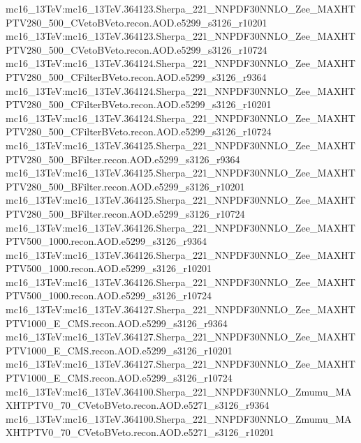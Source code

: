 { mc16\_13TeV:mc16\_13TeV.364123.Sherpa\_221\_NNPDF30NNLO\_Zee\_MAXHTPTV280\_500\_CVetoBVeto.recon.AOD.e5299\_s3126\_r10201   \newline  
 mc16\_13TeV:mc16\_13TeV.364123.Sherpa\_221\_NNPDF30NNLO\_Zee\_MAXHTPTV280\_500\_CVetoBVeto.recon.AOD.e5299\_s3126\_r10724 \newline    
 mc16\_13TeV:mc16\_13TeV.364124.Sherpa\_221\_NNPDF30NNLO\_Zee\_MAXHTPTV280\_500\_CFilterBVeto.recon.AOD.e5299\_s3126\_r9364 \newline   
 mc16\_13TeV:mc16\_13TeV.364124.Sherpa\_221\_NNPDF30NNLO\_Zee\_MAXHTPTV280\_500\_CFilterBVeto.recon.AOD.e5299\_s3126\_r10201   \newline  
 mc16\_13TeV:mc16\_13TeV.364124.Sherpa\_221\_NNPDF30NNLO\_Zee\_MAXHTPTV280\_500\_CFilterBVeto.recon.AOD.e5299\_s3126\_r10724 \newline    
 mc16\_13TeV:mc16\_13TeV.364125.Sherpa\_221\_NNPDF30NNLO\_Zee\_MAXHTPTV280\_500\_BFilter.recon.AOD.e5299\_s3126\_r9364  \newline   
 mc16\_13TeV:mc16\_13TeV.364125.Sherpa\_221\_NNPDF30NNLO\_Zee\_MAXHTPTV280\_500\_BFilter.recon.AOD.e5299\_s3126\_r10201 \newline    
 mc16\_13TeV:mc16\_13TeV.364125.Sherpa\_221\_NNPDF30NNLO\_Zee\_MAXHTPTV280\_500\_BFilter.recon.AOD.e5299\_s3126\_r10724  \newline   
 mc16\_13TeV:mc16\_13TeV.364126.Sherpa\_221\_NNPDF30NNLO\_Zee\_MAXHTPTV500\_1000.recon.AOD.e5299\_s3126\_r9364 \newline     
 mc16\_13TeV:mc16\_13TeV.364126.Sherpa\_221\_NNPDF30NNLO\_Zee\_MAXHTPTV500\_1000.recon.AOD.e5299\_s3126\_r10201 \newline    
 mc16\_13TeV:mc16\_13TeV.364126.Sherpa\_221\_NNPDF30NNLO\_Zee\_MAXHTPTV500\_1000.recon.AOD.e5299\_s3126\_r10724   \newline  
 mc16\_13TeV:mc16\_13TeV.364127.Sherpa\_221\_NNPDF30NNLO\_Zee\_MAXHTPTV1000\_E\_CMS.recon.AOD.e5299\_s3126\_r9364  \newline   
 mc16\_13TeV:mc16\_13TeV.364127.Sherpa\_221\_NNPDF30NNLO\_Zee\_MAXHTPTV1000\_E\_CMS.recon.AOD.e5299\_s3126\_r10201 \newline    
 mc16\_13TeV:mc16\_13TeV.364127.Sherpa\_221\_NNPDF30NNLO\_Zee\_MAXHTPTV1000\_E\_CMS.recon.AOD.e5299\_s3126\_r10724 \newline    
 mc16\_13TeV:mc16\_13TeV.364100.Sherpa\_221\_NNPDF30NNLO\_Zmumu\_MAXHTPTV0\_70\_CVetoBVeto.recon.AOD.e5271\_s3126\_r9364 \newline    
 mc16\_13TeV:mc16\_13TeV.364100.Sherpa\_221\_NNPDF30NNLO\_Zmumu\_MAXHTPTV0\_70\_CVetoBVeto.recon.AOD.e5271\_s3126\_r10201 \newline    
}
